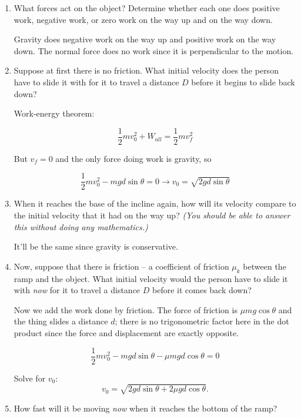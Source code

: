 \documentclass[12pt]{article}
\begin{document}
\begin{enumerate}

\item What forces act on the object? Determine whether each one does positive work, negative work, or zero work on the way up and on the way down.

{\color{Red}Gravity does negative work on the way up and positive work on the way down. The normal force does no work since it is perpendicular to the motion.}


\item	Suppose at first there is no friction. What initial velocity does the person have to slide it with for it to travel a distance $D$ before it begins to slide back down? 

{\color{Red}
	
	Work-energy theorem:
	
	$$\frac{1}{2}mv_0^2 + W_{all} = \frac{1}{2}mv_f^2$$
	
	But $v_f=0$ and the only force doing work is gravity, so
	
	$$\frac{1}{2}mv_0^2 - mgd\sin \theta = 0 \rightarrow v_0 = \sqrt{2gd\sin \theta}$$
}


\item	When it reaches the base of the incline again, how will its velocity compare to the initial velocity that it had on the way up? {\it (You should be able to answer this without doing any mathematics.)}

{\color{Red}It'll be the same since gravity is conservative.}

\item	Now, suppose that there is friction -- a coefficient of friction $\mu_k$ between the ramp and the object. 
What initial velocity would the person have to slide it with {\it now} for it to travel a distance $D$ before it comes back down?

{\color{Red} Now we add the work done by friction. The force of friction is $\mu mg \cos \theta$ and the thing slides a distance $d$; there is no trigonometric factor here in the dot product since the force and displacement are exactly opposite.
	
	
	$$\frac{1}{2}mv_0^2 - mgd\sin \theta - \mu mgd \cos \theta = 0$$
	
	Solve for $v_0$: $$v_0 = \sqrt{2gd\sin \theta + 2\mu gd \cos \theta}.$$
	
}


\item How fast will it be moving {\it now} when it reaches the bottom of the ramp? 


\end{enumerate}
\end{document}
